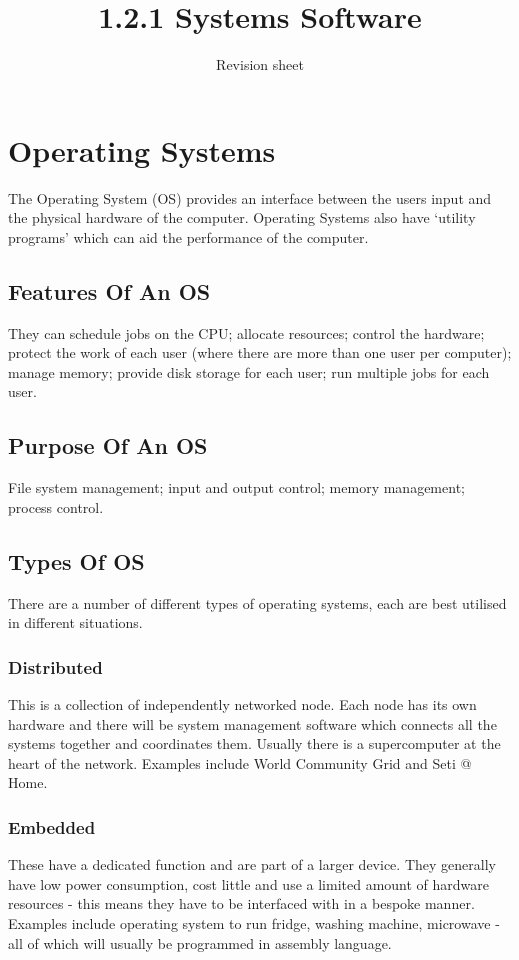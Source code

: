 \documentclass[a4paper,11pt, twocolumn]{article}
\title{1.2.1 Systems Software}
\author{Revision sheet}
\date{}
\begin{document}
\maketitle
\thispagestyle{fancy}

\section{Operating Systems}
The Operating System (OS) provides an interface between the users input and the physical hardware of the computer. Operating Systems also have `utility programs' which can aid the performance of the computer.
\subsection{Features Of An OS}
They can schedule jobs on the CPU; allocate resources; control the hardware; protect the work of each user (where there are more than one user per computer); manage memory; provide disk storage for each user; run multiple jobs for each user. 
\subsection{Purpose Of An OS}
File system management; input and output control; memory management; process control.
\subsection{Types Of OS}
There are a number of different types of operating systems, each are best utilised in different situations.
\subsubsection{Distributed}
This is a collection of independently networked node. Each node has its own hardware and there will be system management software which connects all the systems together and coordinates them. Usually there is a supercomputer at the heart of the network. Examples include World Community Grid and Seti @ Home.
\subsubsection{Embedded}
These have a dedicated function and are part of a larger device. They generally have low power consumption, cost little and use a limited amount of hardware resources - this means they have to be interfaced with in a bespoke manner. Examples include operating system to run fridge, washing machine, microwave - all of which will usually be programmed in assembly language.
\end{document}
